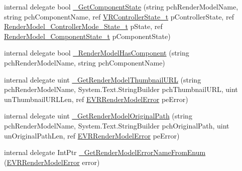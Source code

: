\begin{DoxyCompactItemize}
internal delegate bool \mbox{\hyperlink{struct_valve_1_1_v_r_1_1_i_v_r_render_models_af79285d56f002d4aee1bfc4ad0b1bb78}{\+\_\+\+Get\+Component\+State}} (string pch\+Render\+Model\+Name, string pch\+Component\+Name, ref \mbox{\hyperlink{struct_valve_1_1_v_r_1_1_v_r_controller_state__t}{V\+R\+Controller\+State\+\_\+t}} p\+Controller\+State, ref \mbox{\hyperlink{struct_valve_1_1_v_r_1_1_render_model___controller_mode___state__t}{Render\+Model\+\_\+\+Controller\+Mode\+\_\+\+State\+\_\+t}} p\+State, ref \mbox{\hyperlink{struct_valve_1_1_v_r_1_1_render_model___component_state__t}{Render\+Model\+\_\+\+Component\+State\+\_\+t}} p\+Component\+State)
\item 
internal delegate bool \mbox{\hyperlink{struct_valve_1_1_v_r_1_1_i_v_r_render_models_ae4724e8f8a0a8d43df490e731a70307c}{\+\_\+\+Render\+Model\+Has\+Component}} (string pch\+Render\+Model\+Name, string pch\+Component\+Name)
\item 
internal delegate uint \mbox{\hyperlink{struct_valve_1_1_v_r_1_1_i_v_r_render_models_afd1ebaace88f5874dc31699503bba86e}{\+\_\+\+Get\+Render\+Model\+Thumbnail\+U\+RL}} (string pch\+Render\+Model\+Name, System.\+Text.\+String\+Builder pch\+Thumbnail\+U\+RL, uint un\+Thumbnail\+U\+R\+L\+Len, ref \mbox{\hyperlink{namespace_valve_1_1_v_r_ac95dda09bbb588fd83a8ac0ba3c82266}{E\+V\+R\+Render\+Model\+Error}} pe\+Error)
\item 
internal delegate uint \mbox{\hyperlink{struct_valve_1_1_v_r_1_1_i_v_r_render_models_a894340b0300b94e37c1080e084555301}{\+\_\+\+Get\+Render\+Model\+Original\+Path}} (string pch\+Render\+Model\+Name, System.\+Text.\+String\+Builder pch\+Original\+Path, uint un\+Original\+Path\+Len, ref \mbox{\hyperlink{namespace_valve_1_1_v_r_ac95dda09bbb588fd83a8ac0ba3c82266}{E\+V\+R\+Render\+Model\+Error}} pe\+Error)
\item 
internal delegate Int\+Ptr \mbox{\hyperlink{struct_valve_1_1_v_r_1_1_i_v_r_render_models_afbb07d42a16772bf58407406e41e9aac}{\+\_\+\+Get\+Render\+Model\+Error\+Name\+From\+Enum}} (\mbox{\hyperlink{namespace_valve_1_1_v_r_ac95dda09bbb588fd83a8ac0ba3c82266}{E\+V\+R\+Render\+Model\+Error}} error)
\end{DoxyCompactItemize}
